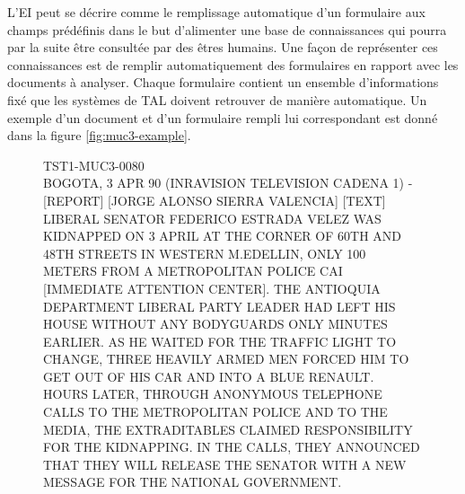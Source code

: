 \documentclass[12pt,a4paper,times,twoside,openright]{report}
\newenvironment{helvetica}{\fontfamily{ppl}\selectfont}{\par}
\begin{document}
L'EI peut se décrire comme le remplissage automatique d'un formulaire aux champs prédéfinis dans le but d'alimenter une base de connaissances \citep{pazienza1997information} qui pourra par la suite être consultée par des êtres humains. Une façon de représenter ces connaissances est de remplir automatiquement des formulaires en rapport avec les documents à analyser. Chaque formulaire contient un ensemble d'informations fixé que les systèmes de TAL doivent retrouver de manière automatique. Un exemple d'un document et d'un formulaire rempli lui correspondant est donné dans la figure \ref{fig:muc3-example}.

\begin{figure}[ht!]
\footnotesize
\begin{tcolorbox}[fonttitle=\bfseries,title=Message]
\begin{helvetica}
TST1-MUC3-0080\\

BOGOTA, 3 APR 90 (INRAVISION TELEVISION CADENA 1) - [REPORT] [JORGE ALONSO SIERRA VALENCIA] [TEXT] LIBERAL SENATOR FEDERICO ESTRADA VELEZ WAS KIDNAPPED ON 3 APRIL AT THE CORNER OF 60TH AND 48TH STREETS IN WESTERN M.EDELLIN, ONLY 100 METERS FROM A METROPOLITAN POLICE CAI [IMMEDIATE ATTENTION CENTER]. THE ANTIOQUIA DEPARTMENT LIBERAL PARTY LEADER HAD LEFT HIS HOUSE WITHOUT ANY BODYGUARDS ONLY MINUTES EARLIER. AS HE WAITED FOR THE TRAFFIC LIGHT TO CHANGE, THREE HEAVILY ARMED MEN FORCED HIM TO GET OUT OF HIS CAR AND INTO A BLUE RENAULT.\\

HOURS LATER, THROUGH ANONYMOUS TELEPHONE CALLS TO THE METROPOLITAN POLICE AND TO THE MEDIA, THE EXTRADITABLES CLAIMED RESPONSIBILITY FOR THE KIDNAPPING. IN THE CALLS, THEY ANNOUNCED THAT THEY WILL RELEASE THE SENATOR WITH A NEW MESSAGE FOR THE NATIONAL GOVERNMENT.\\


\end{helvetica}
\end{tcolorbox}
\end{figure}
\end{document}
